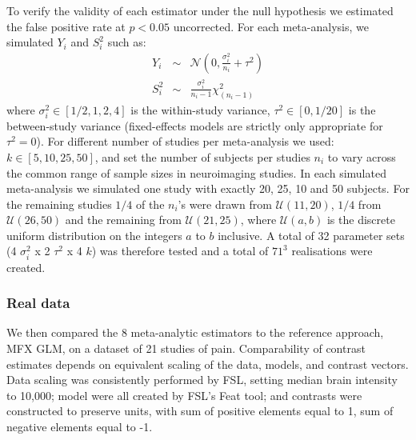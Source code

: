\documentclass{llncs}
\newcommand{\effectvector}{Y}
\newcommand{\effect}[1][i]{\effectvector_{#1}}
\newcommand{\vareffect}[1][i]{S^2_{#1}}
\newcommand{\nStudies}{k}
\newcommand{\varBetween}{\tau^2}
\newcommand{\sampleSize}[1][i]{n_{#1}}
\newcommand{\varWithin}[1][i]{\sigma^2_{#1}}
\begin{document}
To verify the validity of each estimator under the null hypothesis we estimated the false positive rate at $p<0.05$ uncorrected. For each meta-analysis, we simulated $\effect$ and $\vareffect$ such as:
\begin{eqnarray}
	\effect &\sim& \mathcal{N}(0, \frac{\varWithin}{\sampleSize}+\varBetween) \\
	\vareffect &\sim& \frac{\varWithin}{\sampleSize-1} \chi^2_{(\sampleSize-1)}%
\end{eqnarray}
where $\varWithin \in [1/2, 1, 2, 4]$ is the within-study variance, $\varBetween \in [0, 1/20]$ is the between-study variance (fixed-effects models are strictly only appropriate for $\varBetween=0$). For different number of studies per meta-analysis we used: $\nStudies \in [5, 10, 25, 50]$, and set the number of subjects per studies $\sampleSize$ to vary across the common range of sample sizes in neuroimaging studies. In each simulated meta-analysis we simulated one study with exactly 20, 25, 10 and 50 subjects. For the remaining studies $1/4$ of the $\sampleSize$'s were drawn from $\mathcal{U}(11,20)$, $1/4$ from $\mathcal{U}(26,50)$ and the remaining from $\mathcal{U}(21,25)$, where $\mathcal{U}(a,b)$ is the discrete uniform distribution on the integers $a$ to $b$ inclusive. A total of 32 parameter sets (4 $\varWithin$ x 2 $\varBetween$ x 4 $\nStudies$) was therefore tested and a total of $71^3$ realisations were created.


\subsubsection{Real data}
We then compared the 8 meta-analytic estimators to the reference approach, MFX GLM, on a dataset of 21 studies of pain. 
Comparability of contrast estimates depends on equivalent scaling of the data, models, and contrast vectors. Data scaling was consistently performed by FSL, setting median brain intensity to 10,000; model were all created by FSL's Feat tool; and contrasts were constructed to preserve units, with sum of positive elements equal to 1, sum of negative elements equal to -1. 


\end{document}
